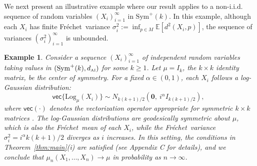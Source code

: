 \documentclass[preprint]{imsart}
\def\Frechet{Fr\'{e}chet}
\theoremstyle{plain}
\newtheorem{corollary}{Corollary}
\newtheorem{example}{Example}
\theoremstyle{remark}
\begin{document}
We next present an illustrative example where our result applies to a non-i.i.d. sequence of random variables $(X_i)_{i=1}^{\infty}$ in $\mathrm{Sym}^+(k)$.  
In this example, although each $X_i$ has finite \Frechet\ variance $\sigma_i^2 := \inf_{p\in M} \mathbb{E}[d^2(X_i, p)]$, the sequence of variances $(\sigma_i^2)_{i=1}^\infty$ is unbounded. 


\begin{example} 
Consider a sequence $(X_i)_{i=1}^{\infty}$ of independent random variables taking values in $(\mathrm{Sym}^+(k),d_{\text{\tiny AI}})$ for some $k \ge 1$. Let $\mu = I_k$, the $k \times k$ identity matrix, be the center of symmetry. For a fixed $\alpha \in (0,1)$, each $X_i$ follows a log-Gaussian distribution:
$$\textsf{vec}\{\mbox{Log}_{\mu}(X_i)\} \sim N_{k(k+1)/2}(\textbf{0}, ~i^{\alpha}I_{k(k+1)/2}),$$ 
where $\textsf{vec}(\cdot)$ denotes the vectorization operator appropriate for symmetric $k \times k$ matrices \citep[][Section 3.5]{pennec2006riemannian}.  
The log-Gaussian distributions are geodesically symmetric about $\mu$, which is also the  \Frechet\ mean of each $X_i$, while the \Frechet\ variance $\sigma_i^2 = i^\alpha k(k+1)/2$ diverges as $i$ increases. 
In this setting, the conditions in Theorem~\ref{thm:main}(i) are satisfied (see Appendix C for details), and we conclude that $\mu_n(X_1,\ldots, X_n) \to \mu$ in probability as $n \to \infty$. 
\end{example}



\end{document}

